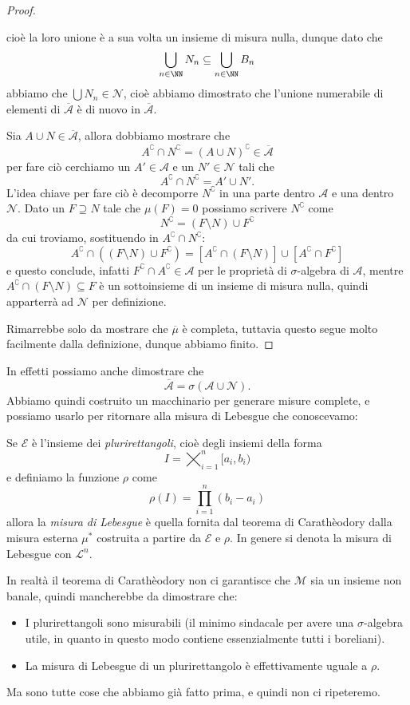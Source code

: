 \documentclass[11pt]{scrartcl}
\begin{document}
\begin{proof}
\begin{description}
			cioè la loro unione è a sua volta un insieme di misura nulla, dunque dato che
			$$\bigcup_{n\in\NN}N_n \subseteq \bigcup_{n\in\NN}B_n$$	
			abbiamo che $\bigcup N_n\in \mathcal{N}$, cioè abbiamo dimostrato che l'unione numerabile di elementi di $\overline{\mathcal{A}}$ è di nuovo in $\overline{\mathcal{A}}$. 	
			\item[Complementari:] Sia $A\cup N\in \overline{\mathcal{A}}$, allora dobbiamo mostrare che
			$$A^\complement \cap N^\complement = \left(A\cup N\right)^\complement \in \overline{\mathcal{A}}$$
			per fare ciò cerchiamo un $A'\in \mathcal{A}$ e un $N'\in \mathcal{N}$ tali che
			$$A^\complement \cap N^\complement = A'\cup N'.$$
			L'idea chiave per fare ciò è decomporre $N^\complement$ in una parte dentro $\mathcal{A}$ e una dentro $\mathcal{N}$. Dato un $F\supseteq N$ tale che $\mu(F)=0$ possiamo scrivere $N^\complement$ come
			$$N^\complement = \left(F\setminus N \right)\cup F^\complement$$
			da cui troviamo, sostituendo in $A^\complement \cap N^\complement$:
			$$A^\complement\cap \left(\left(F\setminus N \right)\cup F^\complement\right)=\left[A^\complement\cap \left(F\setminus N\right)\right]\cup \left[A^\complement \cap F^\complement\right]$$
			e questo conclude, infatti $F^\complement\cap A^\complement\in \mathcal{A}$ per le proprietà di $\sigma$-algebra di $\mathcal{A}$, mentre $A^\complement\cap \left(F\setminus N\right)\subseteq F$ è un sottoinsieme di un insieme di misura nulla, quindi apparterrà ad $\mathcal{N}$ per definizione.
		\end{description}
		Rimarrebbe solo da mostrare che $\overline{\mu}$ è completa, tuttavia questo segue molto facilmente dalla definizione, dunque abbiamo finito.
	\end{proof}
	In effetti possiamo anche dimostrare che
	$$\overline{\mathcal{A}}=\sigma\left(\mathcal{A}\cup \mathcal{N}\right).$$
	Abbiamo quindi costruito un macchinario per generare misure complete, e possiamo usarlo per ritornare alla misura di Lebesgue che conoscevamo:
	\begin{example}
		Se $\mathcal{E}$ è l'insieme dei \textit{plurirettangoli}, cioè degli insiemi della forma
		$$I=\bigtimes_{i=1}^n[a_i,b_i)$$
		e definiamo la funzione $\rho$ come
		$$\rho\left(I\right)=\prod_{i=1}^n\left(b_i-a_i\right)$$
		allora la \textit{misura di Lebesgue} è quella fornita dal teorema di Carathèodory dalla misura esterna $\mu^*$ costruita a partire da $\mathcal{E}$ e $\rho$. In genere si denota la misura di Lebesgue con $\mathscr{L}^n$.
	\end{example}
	In realtà il teorema di Carathèodory non ci garantisce che $\mathcal{M}$ sia un insieme non banale, quindi mancherebbe da dimostrare che:
	\begin{itemize}
		\item I plurirettangoli sono misurabili (il minimo sindacale per avere una $\sigma$-algebra utile, in quanto in questo modo contiene essenzialmente tutti i boreliani).
		\item La misura di Lebesgue di un plurirettangolo è effettivamente uguale a $\rho$.
	\end{itemize}
	Ma sono tutte cose che abbiamo già fatto prima, e quindi non ci ripeteremo.
	
\end{document}
